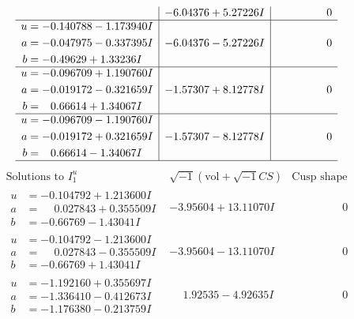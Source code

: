 \documentclass[1p]{elsarticle_modified}
\theoremstyle{definition}
\newcommand{\I}{\sqrt{-1}}
\begin{document}
$$\begin{array}{c|c|c}
 & -6.04376 + 5.27226 I & \phantom{-0.000000 } 0 \\ \hline\begin{aligned}
u &= -0.140788 - 1.173940 I \\
a &= -0.047975 - 0.337395 I \\
b &= -0.49629 + 1.33236 I\end{aligned}
 & -6.04376 - 5.27226 I & \phantom{-0.000000 } 0 \\ \hline\begin{aligned}
u &= -0.096709 + 1.190760 I \\
a &= -0.019172 - 0.321659 I \\
b &= \phantom{-}0.66614 + 1.34067 I\end{aligned}
 & -1.57307 + 8.12778 I & \phantom{-0.000000 } 0 \\ \hline\begin{aligned}
u &= -0.096709 - 1.190760 I \\
a &= -0.019172 + 0.321659 I \\
b &= \phantom{-}0.66614 - 1.34067 I\end{aligned}
 & -1.57307 - 8.12778 I & \phantom{-0.000000 } 0\\
 \hline 
 \end{array}$$\newpage$$\begin{array}{c|c|c}  
\text{Solutions to }I^u_{1}& \I (\text{vol} + \sqrt{-1}CS) & \text{Cusp shape}\\
 \hline 
\begin{aligned}
u &= -0.104792 + 1.213600 I \\
a &= \phantom{-}0.027843 + 0.355509 I \\
b &= -0.66769 - 1.43041 I\end{aligned}
 & -3.95604 + 13.11070 I & \phantom{-0.000000 } 0 \\ \hline\begin{aligned}
u &= -0.104792 - 1.213600 I \\
a &= \phantom{-}0.027843 - 0.355509 I \\
b &= -0.66769 + 1.43041 I\end{aligned}
 & -3.95604 - 13.11070 I & \phantom{-0.000000 } 0 \\ \hline\begin{aligned}
u &= -1.192160 + 0.355697 I \\
a &= -1.336410 - 0.412673 I \\
b &= -1.176380 - 0.213759 I\end{aligned}
 & \phantom{-}1.92535 - 4.92635 I & \phantom{-0.000000 } 0 \\ \hline\begin{aligned}

\end{aligned}
\end{array}$$
\end{document}
